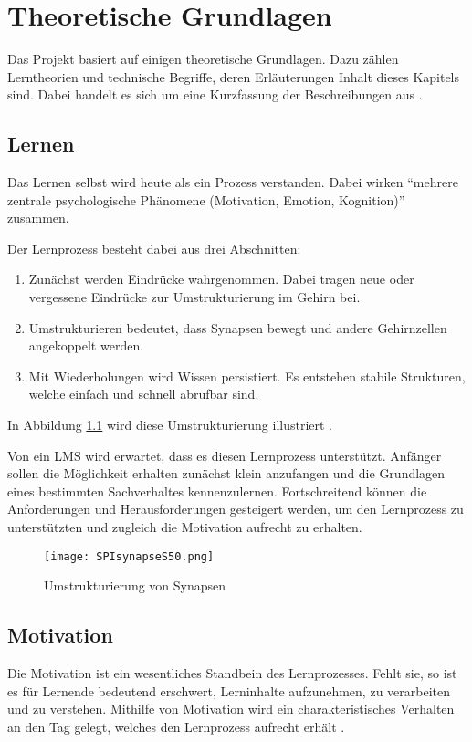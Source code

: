 \chapter{Theoretische Grundlagen}
Das Projekt basiert auf einigen theoretische Grundlagen. Dazu zählen
Lerntheorien und technische Begriffe, deren Erläuterungen Inhalt
dieses Kapitels sind. Dabei handelt es sich um eine Kurzfassung der
Beschreibungen aus \cite{gruben:2012}.

\section{Lernen}
Das Lernen selbst wird heute als ein Prozess verstanden. Dabei wirken "`mehrere
zentrale psychologische Phänomene (Motivation, Emotion,
Kognition)"'\cite{niegemann:2004} zusammen. 

Der Lernprozess besteht dabei aus drei Abschnitten:
\begin{enumerate}
  \item Zunächst werden Eindrücke wahrgenommen. Dabei tragen neue oder
  vergessene Eindrücke zur Umstrukturierung im Gehirn bei.
  \item Umstrukturieren bedeutet, dass Synapsen bewegt und andere Gehirnzellen
  angekoppelt werden.
  \item Mit Wiederholungen wird Wissen persistiert. Es entstehen stabile
  Strukturen, welche einfach und schnell abrufbar sind.
\end{enumerate}
In Abbildung \ref{pic:structSyn} wird diese Umstrukturierung illustriert
\cite{spitzer:2012}.

Von ein LMS wird erwartet, dass es diesen Lernprozess unterstützt. Anfänger
sollen die Möglichkeit erhalten zunächst klein anzufangen und die Grundlagen
eines bestimmten Sachverhaltes kennenzulernen. Fortschreitend können die
Anforderungen und Herausforderungen gesteigert werden, um den Lernprozess zu
unterstützten und zugleich die Motivation aufrecht zu erhalten.

\begin{figure}[H]
\centering
\texttt{[image: SPIsynapseS50.png]}
\caption{Umstrukturierung von Synapsen \footnotemark}\label{pic:structSyn}
\end{figure}

\section{Motivation}
Die Motivation ist ein wesentliches Standbein des Lernprozesses. Fehlt sie, so
ist es für Lernende bedeutend erschwert, Lerninhalte aufzunehmen, zu verarbeiten
und zu verstehen. Mithilfe von Motivation wird ein charakteristisches Verhalten
an den Tag gelegt, welches den Lernprozess aufrecht erhält \cite{jacobs:2010}.


